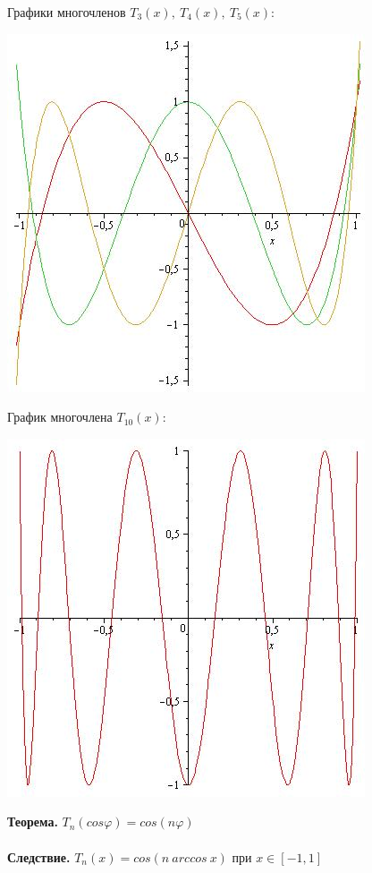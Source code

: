 \documentclass[12pt]{article}
\theoremstyle{definition}
\numberwithin{equation}{section}
\begin{document}
Графики многочленов $T_3(x),~ T_4(x),~ T_5(x)$:\begin{center}
\includegraphics[scale=0.5]{T3T4T5.jpg} \end{center}	
График многочлена $T_{10}(x)$:\begin{center}
\includegraphics[scale=0.5]{T10.jpg} \end{center} 
\textbf{Теорема.}
$T_n(cos \varphi)=cos(n\varphi)$\\
\\
\textbf{Следствие.}
$T_n(x)=cos(n ~ arccos~x)$ при $ x \in [-1, 1]$\\
\\
\end{document}
